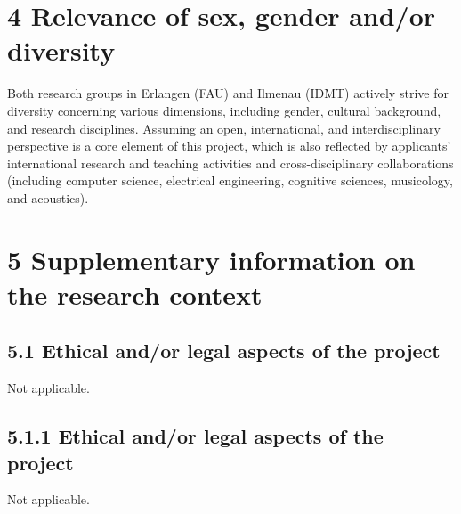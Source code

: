 \documentclass[11pt,a4paper]{article}
\theoremstyle{plain} \newtheorem{define}{Definition}[section]
\begin{document}
{%
\renewcommand{\refname}{}
\vspace*{-1cm}
{

\footnotesize
%

}

\pagebreak[4]

\section*{4 Relevance of sex, gender and/or diversity}

Both research groups in Erlangen (FAU) and Ilmenau (IDMT) actively strive for diversity concerning various dimensions, including gender, cultural background, and research disciplines. Assuming an open, international, and interdisciplinary perspective is a core element of this project, which is also reflected by applicants' international research and teaching activities and cross-disciplinary collaborations (including computer science, electrical engineering, cognitive sciences, musicology, and acoustics).

\section*{5 Supplementary information on the research context}

\subsection*{5.1 Ethical and/or legal aspects of the project}
%
\vspace{-0.4cm}
Not applicable.
\vspace{-0.4cm}

\subsection*{5.1.1 Ethical and/or legal aspects of the project}
%
\vspace{-0.4cm}
Not applicable.
\vspace{-0.4cm}


}
\end{document}
